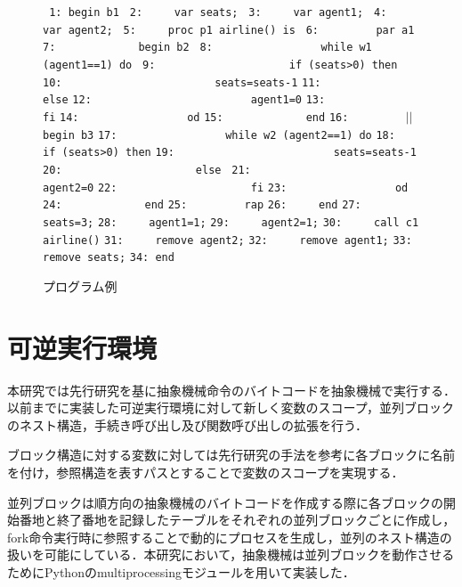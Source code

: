\documentclass[submit,PRO]{ipsj}
\def\|{\verb|}
\begin{document}
\begin{figure}[tb]
\vbox{
\hbox{\| 1: begin b1|}
\hbox{\| 2:     var seats;|}
\hbox{\| 3:     var agent1;|}
\hbox{\| 4:     var agent2;|}
\hbox{\| 5:     proc p1 airline() is|}
\hbox{\| 6:         par a1 |}
\hbox{\| 7:             begin b2|}
\hbox{\| 8:                 while w1 (agent1==1) do|}
\hbox{\| 9:                     if (seats>0) then|}
\hbox{\|10:                        seats=seats-1|}
\hbox{\|11:                     else|}
\hbox{\|12:                         agent1=0|}
\hbox{\|13:                     fi|}
\hbox{\|14:                 od|}
\hbox{\|15:             end|}
\hbox{\|16:         |$||$\|  begin b3|}
\hbox{\|17:                 while w2 (agent2==1) do|}
\hbox{\|18:                     if (seats>0) then|}
\hbox{\|19:                         seats=seats-1|}
\hbox{\|20:                     else |}
\hbox{\|21:                         agent2=0|}
\hbox{\|22:                     fi|}
\hbox{\|23:                 od|}
\hbox{\|24:             end|}
\hbox{\|25:         rap|}
\hbox{\|26:     end|}
\hbox{\|27:     seats=3;|}
\hbox{\|28:     agent1=1;|}
\hbox{\|29:     agent2=1;|}
\hbox{\|30:     call c1 airline()|}
\hbox{\|31:     remove agent2;|}
\hbox{\|32:     remove agent1;|}
\hbox{\|33:     remove seats;|}
\hbox{\|34: end|}
}
\centerline{}
\caption{プログラム例}
\label{fig:sample}
\end{figure}



\section{可逆実行環境}
\label{config}

本研究では先行研究\cite{HIY18,H20}を基に抽象機械命令のバイトコードを抽象機械で実行する．以前までに実装した可逆実行環境に対して新しく変数のスコープ，並列ブロックのネスト構造，手続き呼び出し及び関数呼び出しの拡張を行う．

ブロック構造に対する変数に対しては先行研究の手法を参考に各ブロックに名前を付け，参照構造を表すパスとすることで変数のスコープを実現する．

並列ブロックは順方向の抽象機械のバイトコードを作成する際に各ブロックの開始番地と終了番地を記録したテーブルをそれぞれの並列ブロックごとに作成し，fork命令実行時に参照することで動的にプロセスを生成し，並列のネスト構造の扱いを可能にしている．本研究において，抽象機械は並列ブロックを動作させるためにPythonのmultiprocessingモジュールを用いて実装した．
\end{document}
